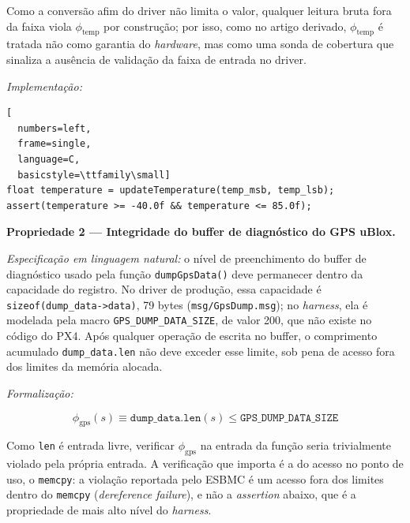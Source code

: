  Como a conversão afim do driver não
limita o valor, qualquer leitura bruta fora da faixa viola $\phi_{\text{temp}}$
por construção; por isso, como no artigo derivado, $\phi_{\text{temp}}$ é tratada
não como garantia do \textit{hardware}, mas como uma sonda de cobertura que
sinaliza a ausência de validação da faixa de entrada no driver.

\textit{Implementação:}

\begin{lstlisting}[
  numbers=left,
  frame=single,
  language=C,
  basicstyle=\ttfamily\small]
float temperature = updateTemperature(temp_msb, temp_lsb);
assert(temperature >= -40.0f && temperature <= 85.0f);
\end{lstlisting}

\textbf{Propriedade 2 --- Integridade do buffer de diagnóstico do GPS uBlox.}

\textit{Especificação em linguagem natural:} o nível de preenchimento do buffer de diagnóstico usado pela função \texttt{dumpGpsData()} deve permanecer dentro da capacidade do registro. No driver de produção, essa capacidade é \texttt{sizeof(dump\_data->data)}, 79 bytes (\texttt{msg/GpsDump.msg}); no \textit{harness}, ela é modelada pela macro \texttt{GPS\_DUMP\_DATA\_SIZE}, de valor 200, que não existe no código do PX4. Após qualquer operação de escrita no buffer, o comprimento acumulado \texttt{dump\_data.len} não deve exceder esse limite, sob pena de acesso fora dos limites da memória alocada.

\textit{Formalização:}

\begin{equation}
\phi_{\text{gps}}(s) \equiv \texttt{dump\_data.len}(s) \leq
\texttt{GPS\_DUMP\_DATA\_SIZE}
\label{eq:prop_gps}
\end{equation}

Como \texttt{len} é entrada livre, verificar $\phi_{\text{gps}}$ na entrada da
função seria trivialmente violado pela própria entrada. A verificação que importa
é a do acesso no ponto de uso, o \texttt{memcpy}: a violação reportada pelo ESBMC
é um acesso fora dos limites dentro do \texttt{memcpy} (\textit{dereference
failure}), e não a \textit{assertion} abaixo, que é a propriedade de mais alto
nível do \textit{harness}. 

